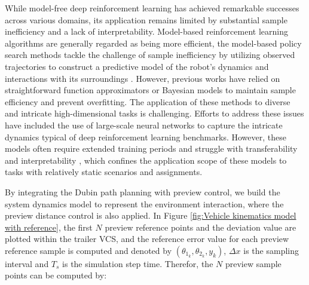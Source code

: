 While model-free deep reinforcement learning has achieved remarkable successes across various domains, its application remains limited by substantial sample inefficiency and a lack of interpretability. Model-based reinforcement learning algorithms are generally regarded as being more efficient, the model-based policy search methods tackle the challenge of sample inefficiency by utilizing observed trajectories to construct a predictive model of the robot's dynamics and interactions with its surroundings \cite{schulman2015trust}. However, previous works have relied on straightforward function approximators \cite{lioutikov2014sample} or Bayesian models \cite{deisenroth2011pilco} to maintain sample efficiency and prevent overfitting. The application of these methods to diverse and intricate high-dimensional tasks is challenging. Efforts to address these issues have included the use of large-scale neural networks to capture the intricate dynamics typical of deep reinforcement learning benchmarks. However, these models often require extended training periods and struggle with transferability and interpretability \cite{nagabandi2018neural}, which confines the application scope of these models to tasks with relatively static scenarios and assignments.

By integrating the Dubin path planning with preview control, we build the system dynamics model to represent the environment interaction, where the preview distance control is also applied. In Figure \ref{fig:Vehicle kinematics model with reference}, the first $N$ preview reference points and the deviation value are plotted within the trailer VCS, and the reference error value for each preview reference sample is computed and denoted by $(\theta_{1_k}, \theta_{2_k}, y_k)$, $\Delta x$ is the sampling interval and $T_s$ is the simulation step time. Therefor, the $N$ preview sample points can be computed by:

